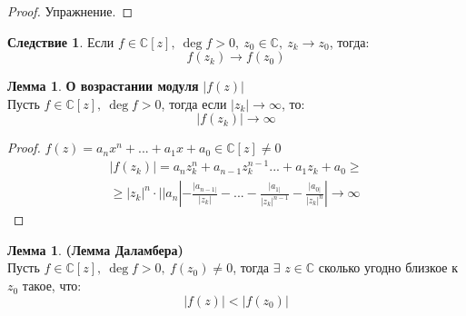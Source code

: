 \documentclass[a4paper, 12pt]{article}
\newcounter{lemcount}
\newcounter{lemcount2}
\theoremstyle{definition}
\newtheorem*{consequense}{Следствие}
\newtheorem{lemmanum}[lemcount]{Лемма}
\begin{document}
  \begin{proof}
    Упражнение.
  \end{proof} 
  \begin{consequense}
    Если $f \in \mathbb{C}[z], \ \deg f >0, \ z_0 \in \mathbb{C}, \ z_k \to z_0$, тогда: 
    $$f(z_k) \to f(z_0)$$  
  \end{consequense}
  \begin{lemmanum} \textbf{О возрастании модуля} $|f(z)|$ \\
    Пусть $f \in \mathbb{C}[z], \ \deg f >0$, тогда если $|z_k| \to \infty$, то:
    $$|f(z_k)| \to \infty$$        
  \end{lemmanum} 
  \begin{proof}
    $f(z) = a_nx^n + ... + a_1x+a_0 \in \mathbb{C}[z] \neq 0$
    \begin{multline*}
      |f(z_k)| = a_nz_k^n + a_{n-1}z_k^{n-1}... + a_1z_k+a_0 \geq \\
      \geq |z_k|^n \cdot ||a_n|-\frac{|a_{n-1|}}{|z_k|} - ... - \frac{|a_{1|}}{|z_k|^{n-1}} - \frac{|a_{0|}}{|z_k|^{n}}| \to \infty
    \end{multline*} 
  \end{proof} 
  \begin{lemmanum}\textbf{(Лемма Даламбера)} \\
    Пусть $f \in \mathbb{C}[z], \ \deg f >0, \ f(z_0) \neq 0$, тогда $\exists$ $z \in \mathbb{C}$ сколько угодно близкое  к $z_0$ такое, что:
    $$|f(z)|< |f(z_0)|$$ 
  \end{lemmanum} 
\end{document}
